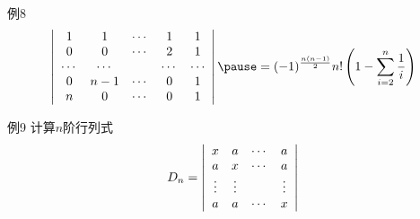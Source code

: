\begin{frame}
  \begin{exampleblock}{例8}
    $$
    \left|
    \begin{array}{ccccc}
      1 & 1 & \cd & 1 & 1 \\
      0 & 0 & \cd & 2 & 1 \\
      \cd & \cd & & \cd & \cd \\
      0 & n-1 & \cd & 0 & 1 \\
      n & 0 & \cd & 0 & 1
    \end{array}
    \right| \pause = (-1)^{\frac{n(n-1)}2} n! \left(1-\sum_{i=2}^n\frac1i\right)
    $$
  \end{exampleblock}
\end{frame}

    
\begin{frame}
  \begin{exampleblock}{例9}
    计算$n$阶行列式
    $$
    D_n = \left|
    \begin{array}{cccc}
      x & a & \cdots & a \\
      a & x & \cdots & a \\
      \vdots & \vdots & & \vdots \\
      a & a &  \cdots & x 
    \end{array}
    \right|
    $$
  \end{exampleblock}
  
\end{frame}

